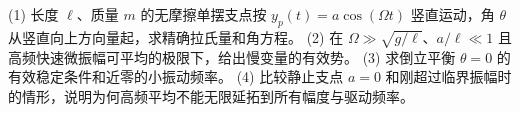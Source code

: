 (1) 长度 \(\ell\)、质量 \(m\) 的无摩擦单摆支点按 \(y_p(t)=a\cos(\Omega t)\) 竖直运动，角 \(\theta\) 从竖直向上方向量起，求精确拉氏量和角方程。
(2) 在 \(\Omega\gg\sqrt{g/\ell}\)、\(a/\ell\ll1\) 且高频快速微振幅可平均的极限下，给出慢变量的有效势。
(3) 求倒立平衡 \(\theta=0\) 的有效稳定条件和近零的小振动频率。
(4) 比较静止支点 \(a=0\) 和刚超过临界振幅时的情形，说明为何高频平均不能无限延拓到所有幅度与驱动频率。
